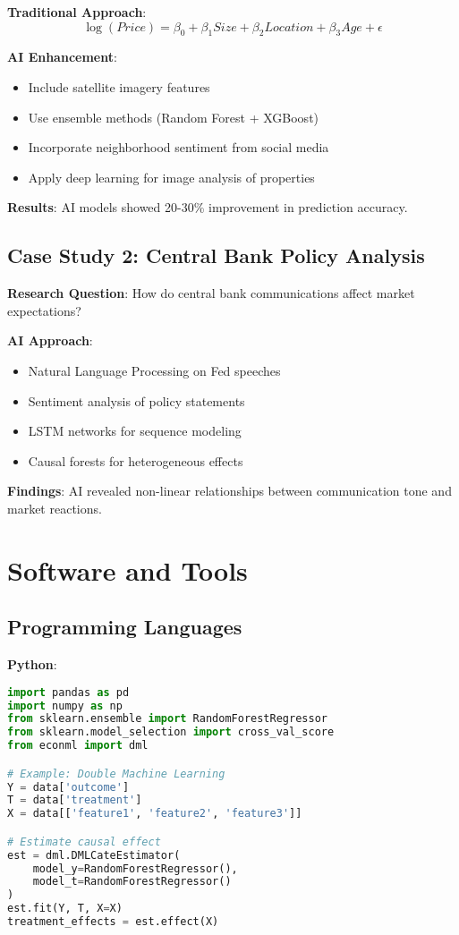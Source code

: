 \documentclass[12pt,a4paper]{article}
\begin{document}
\textbf{Traditional Approach}:
\begin{equation}
\log(Price) = \beta_0 + \beta_1 Size + \beta_2 Location + \beta_3 Age + \epsilon
\end{equation}

\textbf{AI Enhancement}:
\begin{itemize}
    \item Include satellite imagery features
    \item Use ensemble methods (Random Forest + XGBoost)
    \item Incorporate neighborhood sentiment from social media
    \item Apply deep learning for image analysis of properties
\end{itemize}

\textbf{Results}: AI models showed 20-30\% improvement in prediction accuracy.

\subsection{Case Study 2: Central Bank Policy Analysis}

\textbf{Research Question}: How do central bank communications affect market expectations?

\textbf{AI Approach}:
\begin{itemize}
    \item Natural Language Processing on Fed speeches
    \item Sentiment analysis of policy statements
    \item LSTM networks for sequence modeling
    \item Causal forests for heterogeneous effects
\end{itemize}

\textbf{Findings}: AI revealed non-linear relationships between communication tone and market reactions.

\section{Software and Tools}

\subsection{Programming Languages}

\textbf{Python}:
\begin{lstlisting}[language=Python]
import pandas as pd
import numpy as np
from sklearn.ensemble import RandomForestRegressor
from sklearn.model_selection import cross_val_score
from econml import dml

# Example: Double Machine Learning
Y = data['outcome']
T = data['treatment']
X = data[['feature1', 'feature2', 'feature3']]

# Estimate causal effect
est = dml.DMLCateEstimator(
    model_y=RandomForestRegressor(),
    model_t=RandomForestRegressor()
)
est.fit(Y, T, X=X)
treatment_effects = est.effect(X)
\end{lstlisting}
\end{document}
